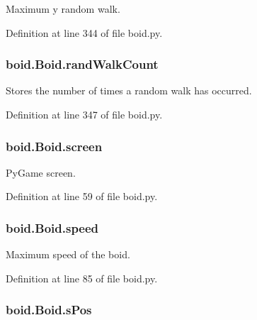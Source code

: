 Maximum y random walk. 



Definition at line 344 of file boid.\-py.

\hypertarget{classboid_1_1Boid_af0bd96c51b17bc6c3f6fec2891b58a3d}{
\subsubsection[{rand\-Walk\-Count}]{\setlength{\rightskip}{0pt plus 5cm}boid.\-Boid.\-rand\-Walk\-Count}}\label{classboid_1_1Boid_af0bd96c51b17bc6c3f6fec2891b58a3d}


Stores the number of times a random walk has occurred. 



Definition at line 347 of file boid.\-py.

\hypertarget{classboid_1_1Boid_aa230e5710394a620995a3943fc9faa8d}{
\subsubsection[{screen}]{\setlength{\rightskip}{0pt plus 5cm}boid.\-Boid.\-screen}}\label{classboid_1_1Boid_aa230e5710394a620995a3943fc9faa8d}


Py\-Game screen. 



Definition at line 59 of file boid.\-py.

\hypertarget{classboid_1_1Boid_a4cf2a59e0efad2d71d8fee93fdd6538b}{
\subsubsection[{speed}]{\setlength{\rightskip}{0pt plus 5cm}boid.\-Boid.\-speed}}\label{classboid_1_1Boid_a4cf2a59e0efad2d71d8fee93fdd6538b}


Maximum speed of the boid. 



Definition at line 85 of file boid.\-py.

\hypertarget{classboid_1_1Boid_a92bf79dcfff9e21d33611cfc89f8823c}{
\subsubsection[{s\-Pos}]{\setlength{\rightskip}{0pt plus 5cm}boid.\-Boid.\-s\-Pos}}\label{classboid_1_1Boid_a92bf79dcfff9e21d33611cfc89f8823c}


